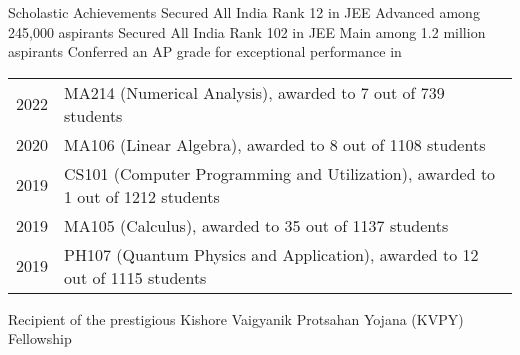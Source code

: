 
\begin{rubric}{Scholastic Achievements}
    \entry*[2019] Secured All India Rank 12 in JEE Advanced among 245,000 aspirants
    \entry*[2019\phantom{}] Secured All India Rank 102 in JEE Main among 1.2 million aspirants
    \entry* Conferred an AP grade for exceptional performance in
        
        \begin{tabular}{@{}ll}
           2022 & MA214 (Numerical Analysis), awarded to 7 out of 739 students \\
           2020 & MA106 (Linear Algebra), awarded to 8 out of 1108 students \\
           2019 & CS101 (Computer Programming and Utilization), awarded to 1 out of 1212 students \\
           2019 & MA105 (Calculus), awarded to 35 out of 1137 students \\
           2019 & PH107 (Quantum Physics and Application), awarded to 12 out of 1115 students \\
        \end{tabular}
    \entry*[2017] Recipient of the prestigious Kishore Vaigyanik Protsahan Yojana (KVPY) Fellowship 
\end{rubric}